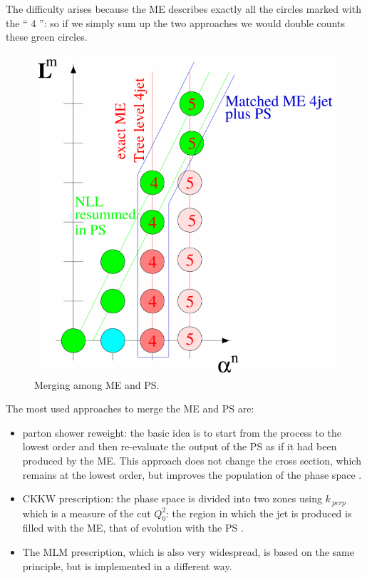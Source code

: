The difficulty arises because the ME describes exactly all the circles marked with the `` 4 '': so if we simply sum up the two approaches 
we would  double counts these green circles.
\begin{figure}
\centering
\includegraphics[scale= 0.7]{../Cap3/Fig_MC/merge}
\caption{ Merging among ME and PS.}
\label{merge}
\end{figure}
The most used approaches to merge the  ME and PS are:
\begin{itemize}
\item  parton shower reweight: the basic idea is to start from the process to the lowest order and then re-evaluate the output of the PS as if it had been produced by the ME. This approach does not change the cross section, which remains at the lowest order, but improves the population of the phase space \cite{ripesamento, ripesamento2}.
\item  CKKW prescription: the phase space is divided into two zones using $ k _ {\ perp} $ which is a measure of the cut $ Q_0 ^ 2 $: the region in which the jet is produced is filled with the ME, that of evolution with the PS \cite{ckkw, ckkw2}. 
\item The MLM prescription, which is also very widespread, is based on the same principle, but is implemented in a different way.
\end{itemize}


